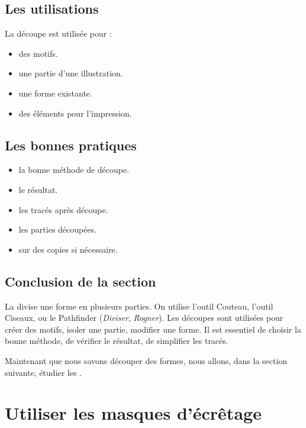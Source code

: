 \subsection{Les utilisations}

La découpe est utilisée pour :

\begin{itemize}
    \item {} des motifs.
    \item {} une partie d'une illustration.
    \item {} une forme existante.
    \item {} des éléments pour l'impression.
\end{itemize}

\subsection{Les bonnes pratiques}

\begin{itemize}
    \item {} la bonne méthode de découpe.
    \item {} le résultat.
    \item {} les tracés après découpe.
    \item {} les parties découpées.
    \item {} sur des copies si nécessaire.
\end{itemize}

\subsection*{Conclusion de la section}

La  divise une forme en plusieurs parties. On utilise l'outil Couteau, l'outil Ciseaux, ou le Pathfinder (\emph{Diviser}, \emph{Rogner}). Les découpes sont utilisées pour créer des motifs, isoler une partie, modifier une forme. Il est essentiel de choisir la bonne méthode, de vérifier le résultat, de simplifier les tracés.

Maintenant que nous savons découper des formes, nous allons, dans la section suivante, étudier les .

\section{Utiliser les masques d'écrêtage}

